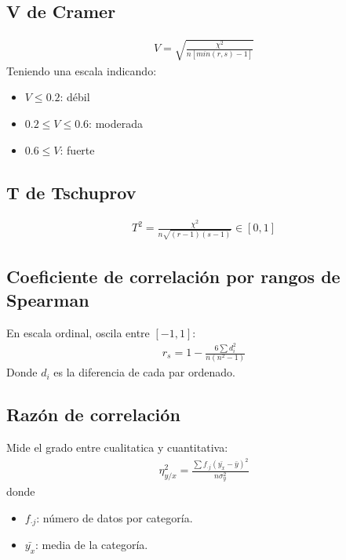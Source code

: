 \documentclass{article}
\begin{document}
\subsection{V de Cramer}
\begin{equation}
    \begin{split}
        V = \sqrt{\frac{\chi^{2}}{n[min(r,s)-1]}}
    \end{split}
\end{equation}
Teniendo una escala indicando:
\begin{itemize}
    \item $V \leq 0.2$: débil
    \item $0.2 \leq V \leq 0.6$: moderada
    \item $0.6 \leq V$: fuerte
\end{itemize}
\subsection{T de Tschuprov}
\begin{equation}
    \begin{split}
        T^2 = \frac{\chi^{2}}{n \sqrt{(r-1)(s-1)}} \in [0,1]
    \end{split}
\end{equation}
\subsection{Coeficiente de correlación por rangos de Spearman}
En escala ordinal, oscila entre $[-1,1]$:
\begin{equation}
    \begin{split}
        r_{s}= 1 - \frac{6 \sum d_{i}^{2}}{n(n^{2}-1)}
    \end{split}
\end{equation}
Donde $d_{i}$ es la diferencia de cada par ordenado.
\subsection{Razón de correlación}
Mide el grado entre cualitatica y cuantitativa:
\begin{equation}
    \begin{split}
        \eta^{2}_{y / x} = \frac{\sum f_{\cdot j} (\bar{y_{x}}- \bar{y})^{2}}{n \sigma^{2}_{y}}
    \end{split}
\end{equation}
donde
\begin{itemize}
    \item $f_{\cdot j}$: número de datos por categoría.
    \item $\bar{y_{x}}$: media de la categoría.
\end{itemize}
\end{document}
